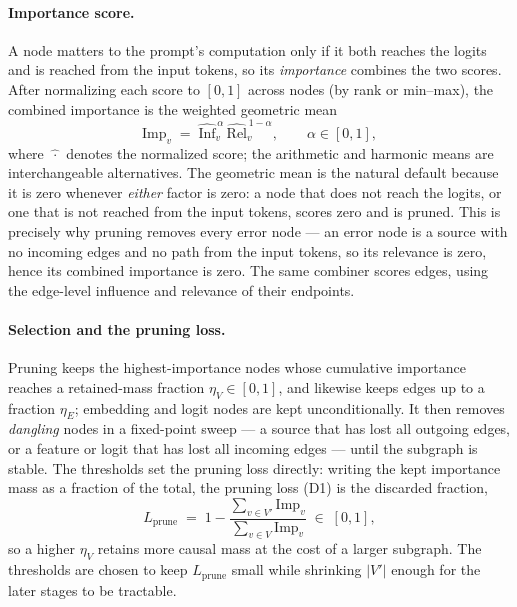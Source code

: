 \documentclass[../main.tex]{subfiles}
\begin{document}
\paragraph{Importance score.}
A node matters to the prompt's computation only if it both reaches the logits and
is reached from the input tokens, so its \emph{importance} combines the two scores.
After normalizing each score to $[0, 1]$ across nodes (by rank or min--max), the
combined importance is the weighted geometric mean
\begin{equation}
\mathrm{Imp}_v \;=\;
\widehat{\mathrm{Inf}}_v^{\,\alpha}\,\widehat{\mathrm{Rel}}_v^{\,1 - \alpha},
\qquad \alpha \in [0, 1],
\label{eq:importance}
\end{equation}
where $\widehat{\,\cdot\,}$ denotes the normalized score; the arithmetic and
harmonic means are interchangeable alternatives. The geometric mean is the natural
default because it is zero whenever \emph{either} factor is zero: a node that does
not reach the logits, or one that is not reached from the input tokens, scores zero
and is pruned. This is precisely why pruning removes every error node --- an error
node is a source with no incoming edges and no path from the input tokens, so its
relevance is zero, hence its combined importance is zero. The same combiner scores
edges, using the edge-level influence and relevance of their endpoints.

\paragraph{Selection and the pruning loss.}
Pruning keeps the highest-importance nodes whose cumulative importance reaches a
retained-mass fraction $\eta_V \in [0, 1]$, and likewise keeps edges up to a
fraction $\eta_E$; embedding and logit nodes are kept unconditionally. It then
removes \emph{dangling} nodes in a fixed-point sweep --- a source that has lost all
outgoing edges, or a feature or logit that has lost all incoming edges --- until the
subgraph is stable. The thresholds set the pruning loss directly: writing the kept
importance mass as a fraction of the total, the pruning loss (D1) is the discarded
fraction,
\begin{equation}
L_{\text{prune}} \;=\; 1 - \frac{\sum_{v \in V'} \mathrm{Imp}_v}{\sum_{v \in V} \mathrm{Imp}_v}
\;\in\; [0, 1],
\label{eq:Lprune}
\end{equation}
so a higher $\eta_V$ retains more causal mass at the cost of a larger subgraph.
The thresholds are chosen to keep $L_{\text{prune}}$ small while shrinking $|V'|$
enough for the later stages to be tractable.
\end{document}
